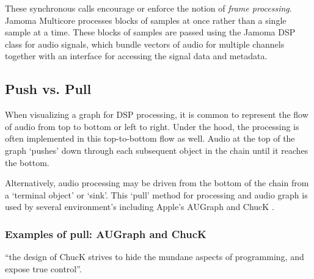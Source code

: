 \documentclass[twoside,a4paper]{article}
\begin{document}

These synchronous calls encourage or enforce the notion of \emph{frame processing}.  Jamoma Multicore processes blocks of samples at once rather than a single sample at a time.  These blocks of samples are passed using the Jamoma DSP class for audio signals, which bundle vectors of audio for multiple channels together with an interface for accessing the signal data and metadata.




\subsection{Push vs. Pull} %

When visualizing a graph for DSP processing, it is common to represent the flow of audio from top to bottom or left to right.  Under the hood, the processing is often implemented in this top-to-bottom flow as well.  Audio at the top of the graph `pushes' down through each subsequent object in the chain until it reaches the bottom.

Alternatively, audio processing may be driven from the bottom of the chain from a `terminal object' or `sink'.  This `pull' method for processing and audio graph is used by several environment's including Apple's AUGraph and ChucK \cite{wang:2008}.


% 


\subsubsection{Examples of pull: AUGraph and ChucK}


``the design of ChucK strives to hide the mundane aspects of programming, and expose true control''\cite{wang:2008}.
\end{document}
